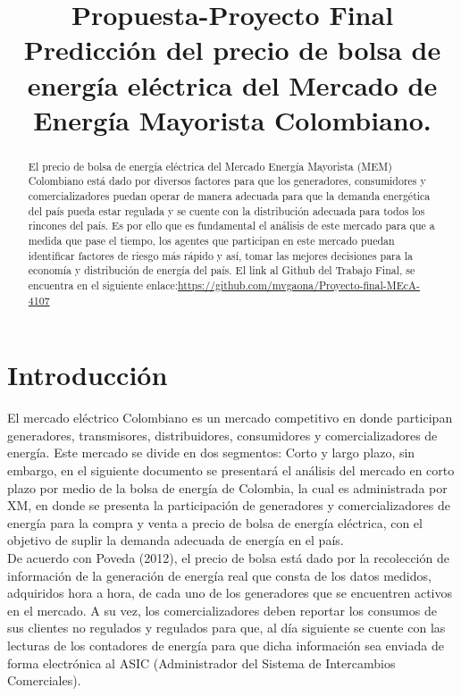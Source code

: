 \documentclass[conference, 10pt]{IEEEtran}
\begin{document}
\title{Propuesta-Proyecto Final\\Predicción del precio de bolsa de energía eléctrica del Mercado de Energía Mayorista Colombiano.}

\author{
\and
{}
}

\maketitle

\begin{abstract}
El precio de bolsa de energía eléctrica del Mercado Energía Mayorista (MEM) Colombiano está dado por diversos factores para que los generadores, consumidores  y comercializadores puedan operar de manera adecuada para que la demanda energética del país pueda estar regulada y se cuente con la distribución adecuada para todos los rincones del país. Es por ello que es fundamental el análisis de este mercado para que a medida que pase el tiempo, los agentes que participan en este mercado puedan identificar factores de riesgo más rápido y así, tomar las mejores decisiones para la economía y  distribución de energía del país. El link al Github del Trabajo Final, se encuentra en el siguiente enlace:\url{https://github.com/mvgaona/Proyecto-final-MEcA-4107}\\


\end{abstract}


\section{Introducción} \label{sec:intro}
El mercado eléctrico Colombiano es un mercado competitivo en donde participan generadores, transmisores, distribuidores, consumidores y comercializadores de energía. Este mercado se divide en dos segmentos: Corto y  largo plazo, sin embargo, en el siguiente documento se presentará el análisis del mercado en corto plazo por medio de la bolsa de energía de Colombia, la cual es  administrada por XM,  en donde se presenta la participación de generadores y comercializadores de energía para la compra y venta a precio de bolsa de energía eléctrica, con el objetivo de suplir la demanda adecuada de energía en el país.  \\
De acuerdo con Poveda (2012)\cite{b1},  el precio de bolsa está dado por la recolección de información de la generación de energía real que consta de los datos medidos, adquiridos hora a hora, de cada uno de los generadores que se encuentren activos en el mercado.  A su vez, los comercializadores deben reportar los consumos de sus clientes no regulados y regulados para que, al día siguiente se cuente con las lecturas de los contadores de energía para que dicha información sea enviada de forma electrónica al ASIC (Administrador del Sistema de Intercambios Comerciales).  \\
\end{document}
